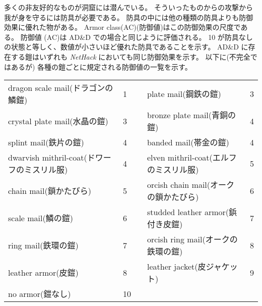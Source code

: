 %
多くの非友好的なものが洞窟には潜んでいる。
そういったものからの攻撃から我が身を守るには防具が必要である。
防具の中には他の種類の防具よりも防御効果に優れた物がある。
Armor class(AC)(防御値)はこの防御効果の尺度である。
防御値 (AC)は AD\&D での場合と同じように評価される。
10 が防具なしの状態と等しく、数値が小さいほど優れた防具であることを示す。
AD\&D に存在する鎧はいずれも {\it NetHack\/} においても同じ防御効果を示す。
以下に(不完全ではあるが) 各種の鎧ごとに規定される防御値の一覧を示す。

\begin{center}
\begin{tabular}{lllll}
dragon scale mail(ドラゴンの鱗鎧) & 1 & & plate mail(鋼鉄の鎧) & 3\\
crystal plate mail(水晶の鎧) & 3 & & bronze plate mail(青銅の鎧) & 4\\
splint mail(鉄片の鎧) & 4 & & banded mail(帯金の鎧) & 4\\
dwarvish mithril-coat(ドワーフのミスリル服) & 4 & & elven mithril-coat(エルフのミスリル服) & 5\\
chain mail(鎖かたびら) & 5 & & orcish chain mail(オークの鎖かたびら) & 6\\
scale mail(鱗の鎧) & 6 & & studded leather armor(鋲付き皮鎧) & 7\\
ring mail(鉄環の鎧) & 7 & & orcish ring mail(オークの鉄環の鎧) & 8\\
leather armor(皮鎧) & 8 & & leather jacket(皮ジャケット) & 9\\
no armor(鎧なし) & 10
\end{tabular}
\end{center}

